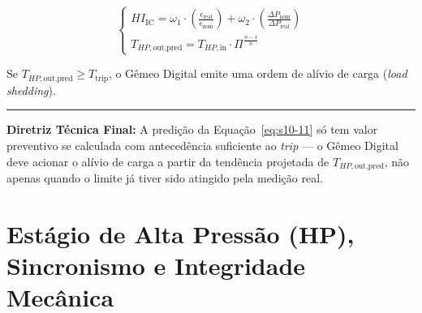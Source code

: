 \documentclass[12pt,a4paper]{article}
\numberwithin{equation}{section}
\numberwithin{table}{section}
\numberwithin{figure}{section}
\begin{document}
{	\begin{equation}\label{eq:s10-11}
	\begin{cases}
		HI_{\text{IC}} = \omega_1 \cdot \left( \frac{\epsilon_{\text{real}}}{\epsilon_{\text{nom}}} \right) + \omega_2 \cdot \left( \frac{\Delta P_{\text{nom}}}{\Delta P_{\text{real}}} \right) \\[10pt]
		T_{HP,\text{out,pred}} = T_{HP,\text{in}} \cdot \Pi^{\frac{n-1}{n}}
	\end{cases}
\end{equation}
	
	Se $T_{HP,\text{out,pred}} \ge T_{\text{trip}}$, o Gêmeo Digital emite uma ordem de alívio de carga (\textit{load shedding}).

	\vspace{1em}
	\hrule
	\vspace{1em}

	\textbf{Diretriz Técnica Final:} A predição da Equação~\eqref{eq:s10-11} só tem valor preventivo se calculada com antecedência suficiente ao \textit{trip} — o Gêmeo Digital deve acionar o alívio de carga a partir da tendência projetada de $T_{HP,\text{out,pred}}$, não apenas quando o limite já tiver sido atingido pela medição real.

	
	
	\clearpage
	\section{\textbf{Estágio de Alta Pressão (HP), Sincronismo e Integridade Mecânica}}

}
\end{document}
